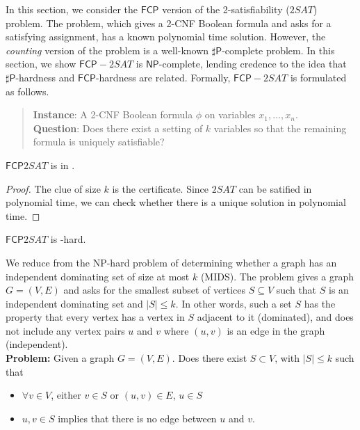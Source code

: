 \documentclass[runningheads,a4paper]{llncs}
\begin{document}
In this section, we consider the $\mathsf{FCP}$ version of the 2-satisfiability ($2SAT$) problem. The problem, which gives a 2-CNF Boolean formula and asks for a satisfying assignment, has a known polynomial time solution. However, the \emph{counting} version of the problem is a well-known $\sharp \mathsf{P}$-complete problem. In this section, we show $\mathsf{FCP}-2SAT$ is $\mathsf{NP}$-complete, lending credence to the idea that $\sharp \mathsf{P}$-hardness and $\mathsf{FCP}$-hardness are related. Formally, $\mathsf{FCP}-2SAT$ is formulated as follows.

\begin{quote}
\textbf{Instance}: A 2-CNF Boolean formula $\phi$ on variables $x_1, ..., x_n$. \\
\textbf{Question}: Does there exist a setting of $k$ variables so that the remaining formula is uniquely satisfiable?
\end{quote}

\begin{proposition}
$\mathsf{FCP} 2SAT$ is in \NP.
\end{proposition}

\begin{proof}
The clue of size $k$ is the certificate. Since $2SAT$ can be satified in polynomial time, we can check whether there is a unique solution in polynomial time.
\end{proof}

\begin{theorem} 
$\mathsf{FCP} 2SAT$ is \NP-hard.
\end{theorem}

We reduce from the NP-hard problem of determining whether a graph has an independent dominating set of size at most $k$ (MIDS). The problem gives a graph $G = (V,E)$ and asks for the smallest subset of vertices $S \subseteq V$ such that $S$ is an independent dominating set and $|S| \leq k$. In other words, such a set $S$ has the property that every vertex has a vertex in $S$ adjacent to it (dominated), and does not include any vertex pairs $u$ and $v$ where $(u,v)$ is an edge in the graph (independent). \\

\noindent\textbf{Problem:} Given a graph $G = (V, E)$. Does there exist $S \subset V$, with $|S| \leq k$ such that 
\begin{itemize}
\item $\forall v \in V$, either $v \in S$ or $(u, v) \in E$, $u \in S$ 
\item $u, v \in S$ implies that there is no edge between $u$ and $v$. 
\end{itemize}
\end{document}
